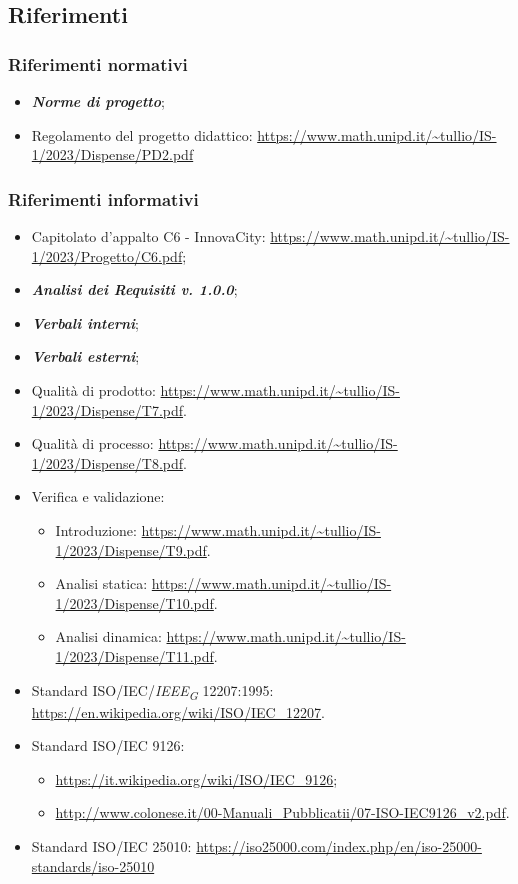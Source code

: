 \subsection{Riferimenti}
\subsubsection{Riferimenti normativi}
\begin{itemize}
    \item \textbf{\textit{Norme di progetto}};
    \item Regolamento del progetto didattico: \url{https://www.math.unipd.it/~tullio/IS-1/2023/Dispense/PD2.pdf}
\end{itemize}
\subsubsection{Riferimenti informativi}
\begin{itemize}
    \item Capitolato d’appalto C6 - InnovaCity: \url{https://www.math.unipd.it/~tullio/IS-1/2023/Progetto/C6.pdf};
    \item \textbf{\textit{Analisi dei Requisiti v. 1.0.0}};
    \item \textbf{\textit{Verbali interni}};
    \item \textbf{\textit{Verbali esterni}};
    \item Qualità di prodotto: \url{https://www.math.unipd.it/~tullio/IS-1/2023/Dispense/T7.pdf}.
    \item Qualità di processo: \url{https://www.math.unipd.it/~tullio/IS-1/2023/Dispense/T8.pdf}.
    \item Verifica e validazione: \begin{itemize}
    \item Introduzione: \url{https://www.math.unipd.it/~tullio/IS-1/2023/Dispense/T9.pdf}.
    \item Analisi statica: \url{https://www.math.unipd.it/~tullio/IS-1/2023/Dispense/T10.pdf}.
    \item Analisi dinamica: \url{https://www.math.unipd.it/~tullio/IS-1/2023/Dispense/T11.pdf}.
    \end{itemize}
    \item Standard ISO/IEC/\textit{IEEE}\textsubscript{\textit{G}} 12207:1995: \url{https://en.wikipedia.org/wiki/ISO/IEC_12207}.
    \item Standard ISO/IEC 9126: \begin{itemize}
        \item \url{https://it.wikipedia.org/wiki/ISO/IEC_9126};
        \item \url{http://www.colonese.it/00-Manuali_Pubblicatii/07-ISO-IEC9126_v2.pdf}.
    \end{itemize}
    \item Standard ISO/IEC 25010: \url{https://iso25000.com/index.php/en/iso-25000-standards/iso-25010}
\end{itemize}
